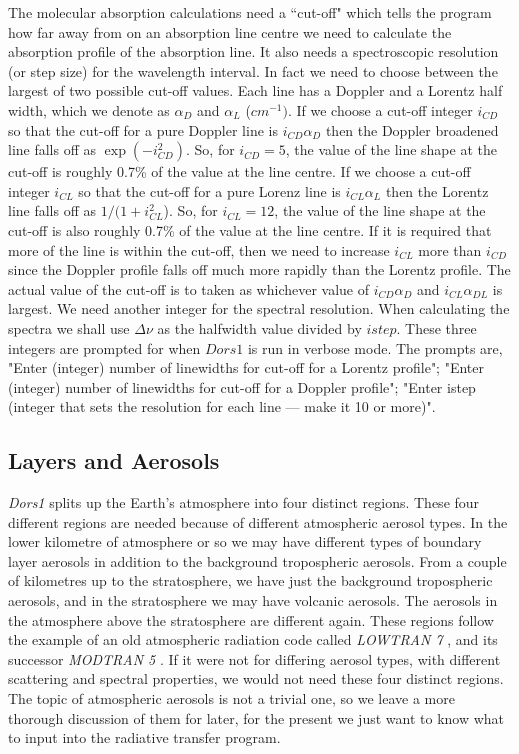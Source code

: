 \documentclass[12pt]{article}
\begin{document}
The molecular absorption calculations need a ``cut-off" which tells
the program how far away from on an absorption line centre we need to calculate the absorption profile
of the absorption line. It also needs a spectroscopic resolution (or step size) for the wavelength interval.
In fact we need to choose between the largest of two possible cut-off values. Each line has a Doppler and a Lorentz
 half width, which we denote as $\alpha_D$ and $\alpha_L$ ($cm^{-1})$. 
If we choose a cut-off integer $i_{CD}$ so that the cut-off for a pure Doppler line is $ i_{CD} \alpha_D$
then the Doppler broadened line falls off as $\exp(-i_{CD}^2)$. So, for $i_{CD}=5$, the value of the line shape at the
cut-off is roughly 0.7\% of the value at the line centre. 
If we choose a cut-off integer $i_{CL}$ so that the cut-off for a pure Lorenz line is $ i_{CL} \alpha_L$
then the Lorentz line falls off as $1/(1+i_{CL}^2$). So, for $i_{CL}=12$, the value of the line shape at the
cut-off is also roughly 0.7\% of the value at the line centre. If it is required that more of the line is within
the cut-off, then we need to increase $i_{CL}$ more than $i_{CD}$ since the Doppler profile falls off much more rapidly
than the Lorentz profile. The actual value of the cut-off is to taken as whichever value of $i_{CD} \alpha_D$
 and $i_{CL} \alpha_{DL}$ is largest. We need another integer for the spectral resolution. When calculating the spectra
we shall use $\Delta \nu$ as the halfwidth value divided by $istep$. These three integers
 are prompted for when $Dors1$ is run in verbose mode. The prompts are,
 "Enter (integer) number of linewidths for cut-off for a Lorentz profile"; "Enter (integer) number of linewidths for cut-off for a Doppler profile"; "Enter istep (integer that sets the resolution for each line --- make it 10 or more)".



\subsection{Layers and Aerosols}

{\it Dors1} splits up the Earth's atmosphere into four distinct regions.
These four different regions are needed because of
 different  atmospheric aerosol types. In the lower
kilometre of atmosphere or so we may have different types of boundary layer
aerosols in addition to the background tropospheric aerosols. From a couple of kilometres
up to the stratosphere, we have  just the background tropospheric aerosols, and in the stratosphere we may have
volcanic aerosols. The aerosols in the atmosphere above the stratosphere are different again.
These regions follow the example of an old atmospheric radiation code called {\it LOWTRAN 7}
\cite{LOWTRAN:Mybib}, and  its successor {\it MODTRAN 5} \cite{MODTRAN:Mybib}.
If it were not for differing aerosol types, with different scattering and spectral properties,
we would not need these four distinct regions. The topic of atmospheric aerosols is not a trivial
one, so we leave a more thorough discussion of them for later, for the present we just
want to know what to input into the radiative transfer program.
\end{document}
